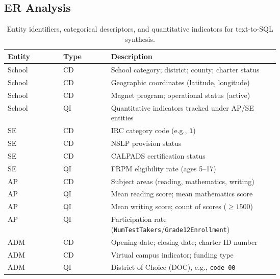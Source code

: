 \documentclass[letterpaper,journal]{IEEEtran}
\begin{document}
\clearpage
\appendices
\onecolumn
\subsection{ER Analysis}
\label{app:er-analysis}


\begin{table}[!ht]
\centering
\small
\setlength{\tabcolsep}{4pt}
\renewcommand{\arraystretch}{1.08}
\caption{Entity identifiers, categorical descriptors, and quantitative indicators for text-to-SQL synthesis.}
\label{tab:er-indicators}
\begin{tabular}{@{}llp{0.62\linewidth}@{}}
\toprule
\textbf{Entity} & \textbf{Type} & \textbf{Description} \\
\midrule
School & CD & School category; district; county; charter status \\
School & CD & Geographic coordinates (latitude, longitude) \\
School & CD & Magnet program; operational status (active) \\
School & QI & Quantitative indicators tracked under AP/SE entities \\
\midrule
SE & CD & IRC category code (e.g., \texttt{1}) \\
SE & CD & NSLP provision status \\
SE & CD & CALPADS certification status \\
SE & QI & FRPM eligibility rate (ages 5--17) \\
\midrule
AP & CD & Subject areas (reading, mathematics, writing) \\
AP & QI & Mean reading score; mean mathematics score \\
AP & QI & Mean writing score; count of scores (\(\geq 1500\)) \\
AP & QI & Participation rate (\texttt{NumTestTakers}/\texttt{Grade12Enrollment}) \\
\midrule
ADM & CD & Opening date; closing date; charter ID number \\
ADM & CD & Virtual campus indicator; funding type \\
ADM & QI & District of Choice (DOC), e.g., \texttt{code 00} \\
\bottomrule
\end{tabular}
\end{table}
\end{document}
